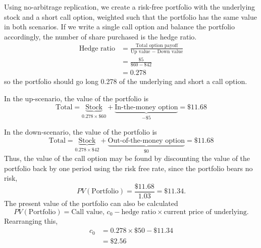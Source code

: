 \documentclass[../notes_compiled.tex]{subfiles}
\begin{document}
\begin{itemize}
{Using no-arbitrage replication, we create a risk-free portfolio with the underlying stock and a short call option, weighted such that the portfolio has the same value in both scenarios. If we write a single call option and balance the portfolio accordingly, the number of share purchased is the hedge ratio.
\begin{align}
\text{Hedge ratio} &= \frac{\text{Total option payoff}}{\text{Up value $-$ Down value}} \\
&= \frac{\$5}{\$60-\$42}  \nonumber \\
&= 0.278 \nonumber
\end{align}
so the portfolio should go long 0.278 of the underlying and short a call option.
\item[] In the up-scenario, the value of the portfolio is
\begin{equation*}
\text{Total} = \underbrace{\text{Stock}}_{0.278 \times \$60}+\underbrace{\text{In-the-money option}}_{- \$5} = \$11.68
\end{equation*}
\item[] In the down-scenario, the value of the portfolio is 
\begin{equation*}
\text{Total} = \underbrace{\text{Stock}}_{0.278 \times \$42}+\underbrace{\text{Out-of-the-money option}}_{\$0} = \$11.68
\end{equation*}
Thus, the value of the call option may be found by discounting the value of the portfolio back by one period using the risk free rate, since the portfolio bears no risk,
\begin{equation*}
PV(\text{Portfolio}) = \frac{\$11.68}{1.03} = \$11.34.
\end{equation*}
The present value of the portfolio can also be calculated
\begin{equation*}
PV(\text{Portfolio}) = \text{Call value, }c_{0} - \text{hedge ratio} \times \text{current price of underlying}.
\end{equation*}
Rearranging this,
\begin{align*}
c_{0} &= 0.278 \times \$50 - \$11.34 \\
&= \$2.56
\end{align*}
}
\end{itemize}
\end{document}
